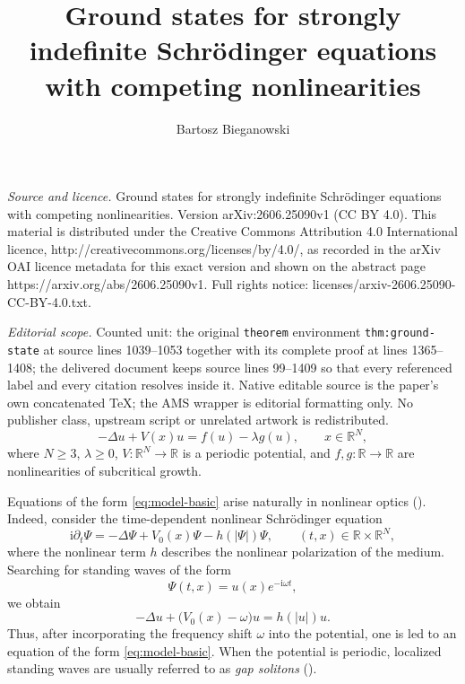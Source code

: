 \documentclass[10pt,a4paper]{amsart}
\numberwithin{equation}{section}
\begin{document}
\title[Ground states for strongly indefinite Schr"odinger equations]{Ground states for strongly indefinite Schr\"{o}dinger equations with competing nonlinearities}
\author{Bartosz Bieganowski}
\date{}
\maketitle
\noindent\emph{Source and licence.} Ground states for strongly indefinite Schr\"{o}dinger equations with competing nonlinearities. Version arXiv:2606.25090v1 (CC BY 4.0). This material is distributed under the Creative Commons Attribution 4.0 International licence, http://creativecommons.org/licenses/by/4.0/, as recorded in the arXiv OAI licence metadata for this exact version and shown on the abstract page https://arxiv.org/abs/2606.25090v1. Full rights notice: licenses/arxiv-2606.25090-CC-BY-4.0.txt.\par\smallskip
\noindent\textit{Editorial scope.} Counted unit: the original \texttt{theorem} environment \texttt{thm:ground-state} at source lines 1039--1053 together with its complete proof at lines 1365--1408; the delivered document keeps source lines 99--1409 so that every referenced label and every citation resolves inside it. Native editable source is the paper's own concatenated TeX; the AMS wrapper is editorial formatting only. No publisher class, upstream script or unrelated artwork is redistributed.
\begin{equation}\label{eq:model-basic}
-\Delta u + V(x)u = f(u)-\lambda g(u),
\qquad x\in \mathbb{R}^N,
\end{equation}
where $N \geq 3$, $\lambda\geq 0$, $V:\mathbb{R}^N\to\mathbb{R}$ is a periodic
potential, and $f,g:\mathbb{R}\to\mathbb{R}$ are nonlinearities of
subcritical growth.

Equations of the form \eqref{eq:model-basic} arise naturally in nonlinear
optics (\cite{Kuchment, Pankov}). Indeed, consider the time-dependent nonlinear Schr\"odinger
equation
\begin{equation}
\mathrm{i}\partial_t\Psi
=
-\Delta\Psi+V_0(x)\Psi-h(|\Psi|)\Psi,
\qquad (t,x)\in \mathbb{R}\times\mathbb{R}^N,
\end{equation}
where the nonlinear term $h$ describes the nonlinear polarization of the medium. Searching for standing
waves of the form
\[
\Psi(t,x)=u(x)e^{-\mathrm{i}\omega t},
\]
we obtain
\[
-\Delta u+\bigl(V_0(x)-\omega\bigr)u=h(|u|)u.
\]
Thus, after incorporating the frequency shift $\omega$ into the potential,
one is led to an equation of the form \eqref{eq:model-basic}. When the
potential is periodic, localized standing waves are usually referred to as
\emph{gap solitons} (\cite{Buryak}).
\end{document}

